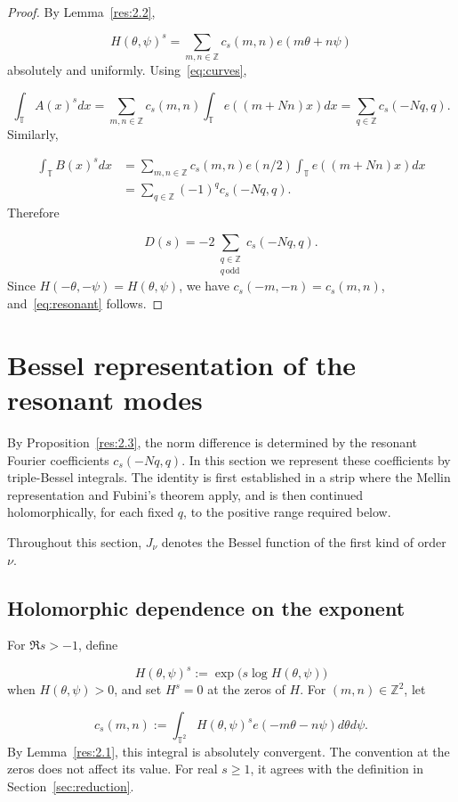 \documentclass[11pt]{article}
\theoremstyle{plain}
\theoremstyle{definition}
\theoremstyle{remark}
\begin{document}
\begin{proof}
By Lemma~\ref{res:2.2},

\[
  H(\theta ,\psi )^s = \sum_{m,n \in \mathbb{Z}} c_s(m,n) e(m\theta + n\psi )
\]
absolutely and uniformly. Using~\eqref{eq:curves},

\[
  \int_{\mathbb{T}} A(x)^s dx = \sum_{m,n \in \mathbb{Z}} c_s(m,n) \int_{\mathbb{T}} e((m + Nn)x) dx = \sum_{q \in \mathbb{Z}} c_s(-Nq, q) .
\]
Similarly,

\begin{align*}
  \int_{\mathbb{T}} B(x)^s dx &= \sum_{m,n \in \mathbb{Z}} c_s(m,n) e(n/2) \int_{\mathbb{T}} e((m + Nn)x) dx \\
  &= \sum_{q \in \mathbb{Z}} (-1)^q c_s(-Nq, q) .
\end{align*}
Therefore

\[
  D(s) = -2 \sum_{\substack{q \in \mathbb{Z} \\ q \,\mathrm{odd}}} c_s(-Nq, q) .
\]
Since $H(-\theta ,-\psi ) = H(\theta ,\psi )$, we have $c_s(-m,-n) = c_s(m,n)$, and~\eqref{eq:resonant} follows.
\end{proof}


\section{Bessel representation of the resonant modes}\label{sec:bessel}

By Proposition~\ref{res:2.3}, the norm difference is determined by the resonant Fourier coefficients $c_s(-Nq, q)$. In this section we represent these coefficients by triple-Bessel integrals. The identity is first established in a strip where the Mellin representation and Fubini's theorem apply, and is then continued holomorphically, for each fixed $q$, to the positive range required below.

Throughout this section, $J_\nu$ denotes the Bessel function of the first kind of order $\nu$.

\subsection{Holomorphic dependence on the exponent}\label{sub:3.1}
For $\Re s > -1$, define

\[
  H(\theta ,\psi )^s := \exp \big( s \log H(\theta ,\psi ) \big)
\]
when $H(\theta ,\psi ) > 0$, and set $H^s = 0$ at the zeros of $H$. For $(m,n) \in \mathbb{Z}^{2}$, let

\[
  c_s(m,n) := \int_{\mathbb{T}^{2}} H(\theta ,\psi )^s e(-m\theta - n\psi ) d\theta d\psi .
\]
By Lemma~\ref{res:2.1}, this integral is absolutely convergent. The convention at the zeros does not affect its value. For real $s \ge 1$, it agrees with the definition in Section~\ref{sec:reduction}.
\end{document}
